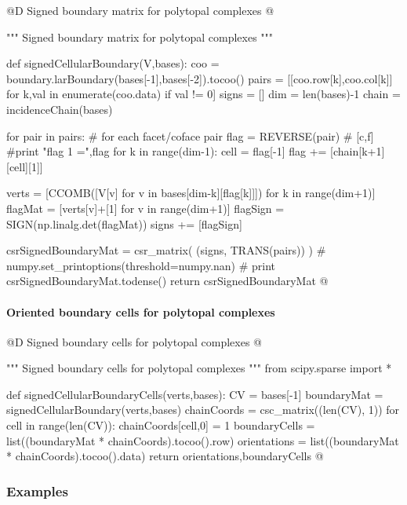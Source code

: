 \documentclass[11pt,oneside]{article}    %
\begin{document}
@D Signed boundary matrix for polytopal complexes
@{""" Signed boundary matrix for polytopal complexes """

def signedCellularBoundary(V,bases):
    coo = boundary.larBoundary(bases[-1],bases[-2]).tocoo()
    pairs = [[coo.row[k],coo.col[k]] for k,val in enumerate(coo.data) if val != 0]
    signs = []
    dim = len(bases)-1
    chain = incidenceChain(bases)
    
    for pair in pairs:        # for each facet/coface pair
        flag = REVERSE(pair) #  [c,f]
        #print "flag 1 =",flag
        for k in range(dim-1):
            cell = flag[-1]
            flag += [chain[k+1][cell][1]]
        
        verts = [CCOMB([V[v] for v in bases[dim-k][flag[k]]]) for k in range(dim+1)]
        flagMat = [verts[v]+[1] for v in range(dim+1)]
        flagSign = SIGN(np.linalg.det(flagMat))
        signs += [flagSign]
    
    csrSignedBoundaryMat = csr_matrix( (signs, TRANS(pairs)) )
    # numpy.set_printoptions(threshold=numpy.nan)
    # print csrSignedBoundaryMat.todense()
    return csrSignedBoundaryMat
@}

\paragraph{Oriented boundary cells for polytopal complexes}

@D Signed boundary cells for polytopal complexes
@{""" Signed boundary cells for polytopal complexes """
from scipy.sparse import *

def signedCellularBoundaryCells(verts,bases):
    CV = bases[-1]
    boundaryMat = signedCellularBoundary(verts,bases)
    chainCoords = csc_matrix((len(CV), 1))
    for cell in range(len(CV)): chainCoords[cell,0] = 1
    boundaryCells = list((boundaryMat * chainCoords).tocoo().row)
    orientations = list((boundaryMat * chainCoords).tocoo().data)
    return orientations,boundaryCells
@}

\subsubsection{Examples}
\end{document}
